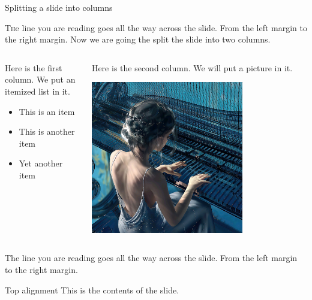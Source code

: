 \documentclass[10pt]{beamer}
\begin{document}
\begin{frame}{Splitting a slide into columns}

  \lettrine{T}he line you are reading goes all the way across the slide.
  From the left margin to the right margin.  Now we are going
  the split the slide into two columns.
  \bigskip
  
  \begin{columns}
    \begin{column}{0.5\textwidth}
      Here is the first column.  We put an itemized list in it.
      \begin{itemize}
        \item This is an item
        \item This is another item
        \item Yet another item
      \end{itemize}
    \end{column}
  
    \begin{column}{0.3\textwidth}
      Here is the second column.  We will put a picture in it.
      \centerline{\includegraphics[width=0.7\textwidth]{../Pic/cover.jpg}}
    \end{column}
  \end{columns}
  \bigskip
  
  The line you are reading goes all the way across the slide.
  From the left margin to the right margin.
  \end{frame}

\begin{frame}[t]{Top alignment} 
  This is the contents of the slide. 
\end{frame} 
  
\end{document}
